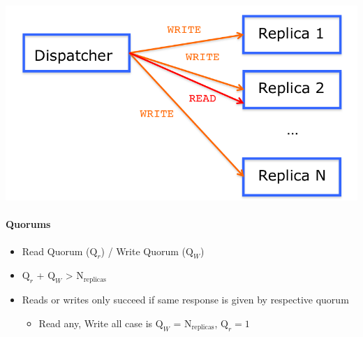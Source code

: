 \includegraphics[scale=0.15]{graphics/read-any-write-all.png}

\paragraph{Quorums}
\begin{itemize}
\item Read Quorum ($\text{Q}_r$) / Write Quorum ($\text{Q}_W$)
\item $\text{Q}_r$ + $\text{Q}_W$ > $\text{N}_{\text{replicas}}$
\item Reads or writes only succeed if same response is given by
  respective quorum
  \begin{itemize}
  \item Read any, Write all case is
    $\text{Q}_W$ = $\text{N}_{\text{replicas}}$, $\text{Q}_r = 1$
  \end{itemize}
\end{itemize}

